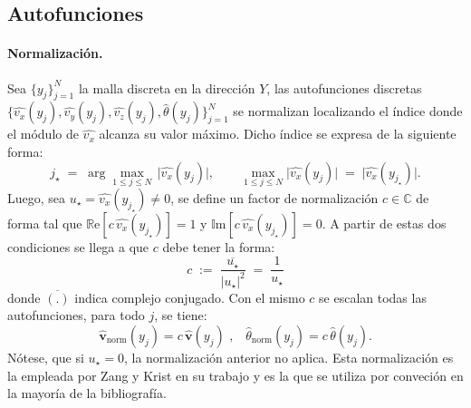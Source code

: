 \subsection{Autofunciones}

\paragraph{Normalización.}
Sea $\{y_j\}_{j=1}^{N}$ la malla discreta en la dirección $Y$, las autofunciones discretas $\{\widehat{v_x}(y_j),\widehat{v_y}(y_j),\widehat{v_z}(y_j),\widehat{\theta}(y_j)\}_{j=1}^{N}$ se normalizan localizando el índice donde el módulo de $\widehat{v_x}$ alcanza su valor máximo. Dicho índice se expresa de la siguiente forma:
$$
j_\star \;=\; \arg\max_{1\le j\le N}\,\big|\widehat{v_x}(y_j)\big|, 
\qquad 
\max_{1\le j\le N}\big|\widehat{v_x}(y_j)\big| \;=\; \big|\widehat{v_x}(y_{j_\star})\big|.
$$
Luego, sea $u_\star=\widehat{v_x}(y_{j_\star})\neq 0$, se define un factor de normalización $c \in \mathbb{C}$ de forma tal que $\mathbb{R}\text{e}[c \, \widehat{v_x}(y_{j_\star})]=1$ y $\mathbb{I}\text{m}[c \, \widehat{v_x}(y_{j_\star})]=0$. A partir de estas dos condiciones se llega a que $c$ debe tener la forma:
$$
c \;:=\; \frac{\overline{u_\star}}{|u_\star|^2} \;=\; \frac{1}{u_\star}
$$
donde $\overline{(\text{.})}$ indica complejo conjugado. Con el mismo $c$ se escalan todas las autofunciones, para todo $j$, se tiene:
$$
\boldsymbol{\widehat{v}}_{\mathrm{norm}}(y_j)=c\,\boldsymbol{\widehat{v}}(y_j) \text{ ,} \quad
\widehat{\theta}_{\mathrm{norm}}(y_j)=c\,\widehat{\theta}(y_j).
$$
Nótese, que si $u_\star=0$, la normalización anterior no aplica. Esta normalización es la empleada por Zang y Krist en su trabajo \cite{zang1989numerical} y es la que se utiliza por conveción en la mayoría de la bibliografía.




